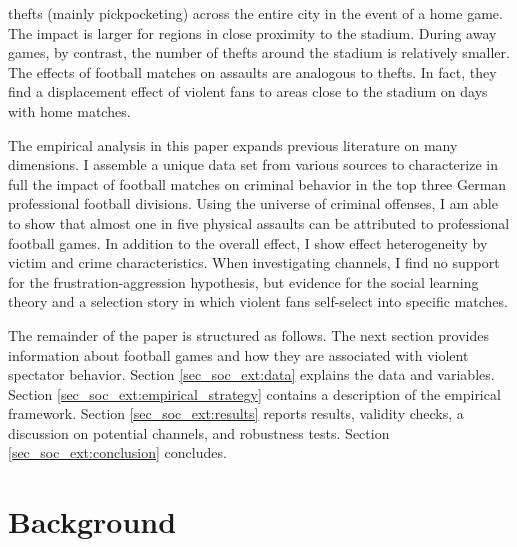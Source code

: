 thefts (mainly pickpocketing) across the entire city in the event of a home game. The impact is larger for regions in close proximity to the stadium. During away games, by contrast, the number of thefts around the stadium is relatively smaller. The effects of football matches on assaults are analogous to thefts. In fact, they find a displacement effect of violent fans to areas close to the stadium on days with home matches.




The empirical analysis in this paper expands previous literature on many dimensions. I assemble a unique data set from various sources to characterize in full the impact of football matches on criminal behavior in the top three German professional football divisions. Using the universe of criminal offenses, I am able to show that almost one in five physical assaults can be attributed to professional football games. In addition to the overall effect, I show effect heterogeneity by victim and crime characteristics. When investigating channels, I find no support for the frustration-aggression hypothesis, but evidence for the social learning theory and a selection story in which violent fans self-select into specific matches.





The remainder of the paper is structured as follows. The next section provides information about football games and how they are associated with violent spectator behavior. Section \ref{sec_soc_ext:data} explains the data and variables. Section \ref{sec_soc_ext:empirical_strategy} contains a description of the empirical framework. Section \ref{sec_soc_ext:results} reports results, validity checks, a discussion on potential channels, and robustness tests. Section \ref{sec_soc_ext:conclusion} concludes.






\bigskip
\section{Background}\label{sec_soc_ext:background}



